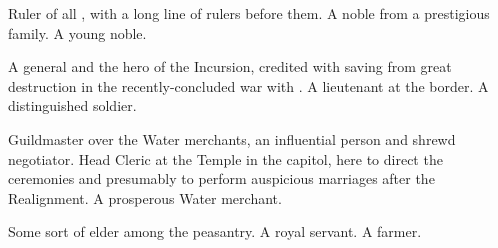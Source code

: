 \documentclass[sheet]{iron}
\begin{document}

\begin{contacts}
\contact{\cRoyalty{}} Ruler of all \sHomeCountry{}, with a long line
of rulers before them.
\contact{\cBastard{}} A noble from a prestigious family.
\contact{\cHotPerson{}} A young noble.
\end{contacts}

\begin{contacts}
\contact{\cMulan{}} A general and the hero of the \sMulanCountryAdj{} Incursion,
credited with saving \sHomeCountry{} from great destruction in the
recently-concluded war with \sMulanCountry{}.
\contact{\cLieutenant{}} A lieutenant at the border.
\contact{\cRealPriest{}} A distinguished soldier.
\end{contacts}

\begin{contacts}
\contact{\cGuildmaster{}} Guildmaster over the Water merchants, an influential
  person and shrewd negotiator.
\contact{\cFakePriest{}} Head Cleric at the Temple in the capitol, here
  to direct the ceremonies and presumably to perform auspicious marriages
  after the Realignment.
\contact{\cTrickster{}} A prosperous Water merchant.
\end{contacts}

\begin{contacts}
\contact{\cSpy{}} Some sort of elder among the peasantry.
\contact{\cServant{}} A royal servant.
\contact{\cPatriot{}} A farmer.
\end{contacts}
\end{document}
